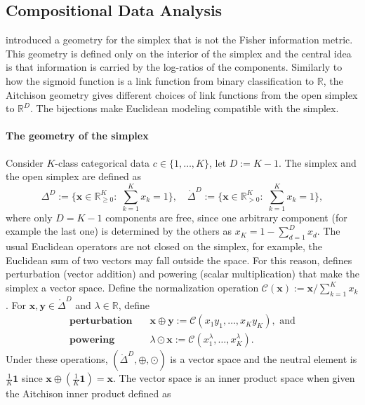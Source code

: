 \subsection{Compositional Data Analysis}

\citet{Aitchison1981, Aitchison1982} introduced a geometry for the simplex that is not the Fisher information metric. This geometry is defined only on the interior of the simplex and the central idea is that information is carried by  the log-ratios of the components. Similarly to how the sigmoid function is a link function from binary classification to $\mathbb{R}$, the Aitchison geometry gives different choices of link functions from the open simplex to $\mathbb{R}^D$. The bijections make Euclidean modeling compatible with the simplex.

\paragraph{The geometry of the simplex}
Consider $K$-class categorical data $c\in\{1,\dots,K\}$, let $D:=K-1$.
The simplex and the open simplex are defined as
\begin{equation*}
    \Delta^{D}:=\{\boldsymbol{x}\in\mathbb{R}_{\ge 0}^{K}:\;\sum_{k=1}^{K}x_k=1\}, \quad 
    \mathring{\Delta}^{D}:=\{\boldsymbol{x}\in\mathbb{R}_{> 0}^{K}:\;\sum_{k=1}^{K}x_k=1\},
\end{equation*}
where only $D=K-1$ components are free, since one arbitrary component (for example the last one) is determined by the others as $x_K = 1-\sum_{d=1}^D x_d$.
The usual Euclidean operators are not closed on the simplex, for example, the Euclidean sum of two vectors may fall outside the space. For this reason, \cite{Aitchison1986} defines perturbation (vector addition) and powering (scalar multiplication) that make the simplex a vector space. Define the normalization operation $\mathcal{C}(\boldsymbol{x}) := \boldsymbol{x}/\sum_{k=1}^{K} x_k$. For $\boldsymbol{x}, \boldsymbol{y}\in\mathring\Delta^D$ and $\lambda\in \mathbb{R}$, define
\begin{align*}
\textbf{perturbation} \quad
&\boldsymbol{x} \oplus \boldsymbol{y}
:= \mathcal{C}(x_1 y_1,\ldots, x_K y_K), \text{ and} \\
\textbf{powering} \quad
&\lambda \odot \boldsymbol{x}
:= \mathcal{C}(x_1^\lambda,\ldots, x_K^\lambda).
\end{align*}
Under these operations, $(\mathring\Delta^D, \oplus, \odot)$ is a vector space and the neutral element  is $\tfrac{1}{K}\boldsymbol{1}$ since $\boldsymbol x \oplus (\tfrac{1}{K}\boldsymbol{1}) = \boldsymbol x$. The vector space is an inner product space when given the Aitchison inner product defined as

